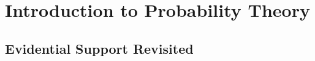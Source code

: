 \chapter{Introduction to Probability Theory}
\label{ch:introprobability}
\setlength{\parindent}{1em}

\section{Evidential Support Revisited}
